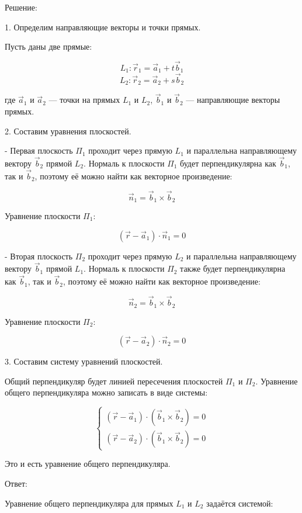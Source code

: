 \documentclass[a4paper,14pt]{extreport} %
\begin{document}
 Решение: 

1.  Определим направляющие векторы и точки прямых. 

   Пусть даны две прямые:

   \[
   L_1: \vec{r}_1 = \vec{a}_1 + t\vec{b}_1
   \]
   \[
   L_2: \vec{r}_2 = \vec{a}_2 + s\vec{b}_2
   \]

   где \(\vec{a}_1\) и \(\vec{a}_2\) — точки на прямых \(L_1\) и \(L_2\), \(\vec{b}_1\) и \(\vec{b}_2\) — направляющие векторы прямых.

2.  Составим уравнения плоскостей. 

   - Первая плоскость \(\Pi_1\) проходит через прямую \(L_1\) и параллельна направляющему вектору \(\vec{b}_2\) прямой \(L_2\). Нормаль к плоскости \(\Pi_1\) будет перпендикулярна как \(\vec{b}_1\), так и \(\vec{b}_2\), поэтому её можно найти как векторное произведение:

     \[
     \vec{n}_1 = \vec{b}_1 \times \vec{b}_2
     \]

     Уравнение плоскости \(\Pi_1\):

     \[
     (\vec{r} - \vec{a}_1) \cdot \vec{n}_1 = 0
     \]

   - Вторая плоскость \(\Pi_2\) проходит через прямую \(L_2\) и параллельна направляющему вектору \(\vec{b}_1\) прямой \(L_1\). Нормаль к плоскости \(\Pi_2\) также будет перпендикулярна как \(\vec{b}_1\), так и \(\vec{b}_2\), поэтому её можно найти как векторное произведение:

     \[
     \vec{n}_2 = \vec{b}_1 \times \vec{b}_2
     \]

     Уравнение плоскости \(\Pi_2\):

     \[
     (\vec{r} - \vec{a}_2) \cdot \vec{n}_2 = 0
     \]

3.  Составим систему уравнений плоскостей. 

   Общий перпендикуляр будет линией пересечения плоскостей \(\Pi_1\) и \(\Pi_2\). Уравнение общего перпендикуляра можно записать в виде системы:

   \[
   \begin{cases}
   (\vec{r} - \vec{a}_1) \cdot (\vec{b}_1 \times \vec{b}_2) = 0 \\
   (\vec{r} - \vec{a}_2) \cdot (\vec{b}_1 \times \vec{b}_2) = 0
   \end{cases}
   \]

   Это и есть уравнение общего перпендикуляра.

 Ответ: 

Уравнение общего перпендикуляра для прямых \(L_1\) и \(L_2\) задаётся системой:
\end{document}

